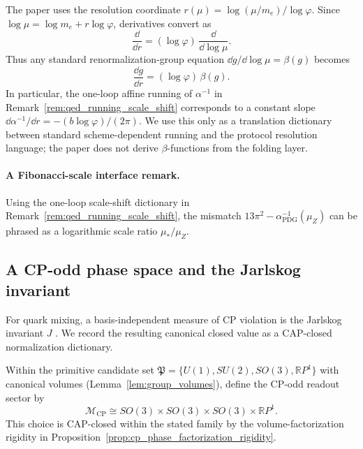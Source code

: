 \begin{remark}\label{rem:rg_in_r_coordinate}
The paper uses the resolution coordinate $r(\mu)=\log(\mu/m_e)/\log\varphi$.
Since $\log\mu=\log m_e + r\log\varphi$, derivatives convert as
\[
\frac{\dd}{\dd r}=(\log\varphi)\,\frac{\dd}{\dd\log\mu}.
\]
Thus any standard renormalization-group equation $\dd g/\dd\log\mu=\beta(g)$ becomes
\[
\frac{\dd g}{\dd r}=(\log\varphi)\,\beta(g).
\]
In particular, the one-loop affine running of $\alpha^{-1}$ in Remark~\ref{rem:qed_running_scale_shift} corresponds to a constant slope $\dd \alpha^{-1}/\dd r=-(b\log\varphi)/(2\pi)$.
We use this only as a translation dictionary between standard scheme-dependent running and the protocol resolution language; the paper does not derive $\beta$-functions from the folding layer.
\end{remark}

\paragraph{A Fibonacci-scale interface remark.}
Using the one-loop scale-shift dictionary in Remark~\ref{rem:qed_running_scale_shift}, the mismatch $13\pi^2-\alpha^{-1}_{\mathrm{PDG}}(\mu_Z)$ can be phrased as a logarithmic scale ratio $\mu_\ast/\mu_Z$.

\subsection{A CP-odd phase space and the Jarlskog invariant}
\label{subsec:cp_jarlskog}

For quark mixing, a basis-independent measure of CP violation is the Jarlskog invariant $J$ \cite{Jarlskog1985}.
We record the resulting canonical closed value as a CAP-closed normalization dictionary.
\begin{definition}\label{def:cp_phase_space}
Within the primitive candidate set $\mathfrak{P}=\{U(1),SU(2),SO(3),\mathbb{R}P^1\}$ with canonical volumes (Lemma~\ref{lem:group_volumes}), define the CP-odd readout sector by
\begin{equation}\label{eq:cp_phase_space}
\mathcal{M}_{\mathrm{CP}}\cong SO(3)\times SO(3)\times SO(3)\times \mathbb{R}P^1.
\end{equation}
This choice is CAP-closed within the stated family by the volume-factorization rigidity in Proposition~\ref{prop:cp_phase_factorization_rigidity}.
\end{definition}

